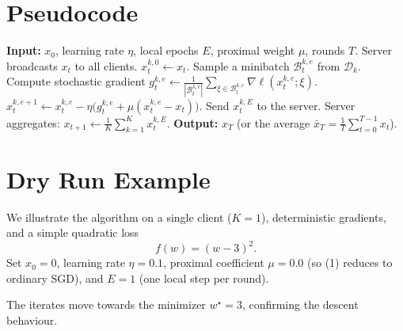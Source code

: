 \documentclass[11pt]{article}
\begin{document}
\section*{Pseudocode}
\begin{algorithm}[H]
\caption{FedProx with Local SGD}
\begin{algorithmic}[1]
\STATE \textbf{Input:} $x_0$, learning rate $\eta$, local epochs $E$, proximal weight $\mu$, rounds $T$.
    \STATE Server broadcasts $x_t$ to all clients.
        \STATE $x_{t}^{k,0}\gets x_t$.
            \STATE Sample a minibatch $\mathcal{B}_{t}^{k,e}$ from $\mathcal{D}_k$.
            \STATE Compute stochastic gradient 
            $g_{t}^{k,e}\gets \frac{1}{|\mathcal{B}_{t}^{k,e}|}\sum_{\xi\in\mathcal{B}_{t}^{k,e}}\nabla\ell(x_{t}^{k,e};\xi)$.
            \STATE $x_{t}^{k,e+1}\gets x_{t}^{k,e}-\eta\big(g_{t}^{k,e}+\mu (x_{t}^{k,e}-x_t)\big)$.
        \ENDFOR
        \STATE Send $x_{t}^{k,E}$ to the server.
    \ENDFOR
    \STATE Server aggregates: $x_{t+1}\gets \frac1K\sum_{k=1}^K x_{t}^{k,E}$.
\ENDFOR
\STATE \textbf{Output:} $x_T$ (or the average $\bar x_T=\frac1T\sum_{t=0}^{T-1}x_t$).
\end{algorithmic}
\end{algorithm}

\section*{Dry Run Example}
We illustrate the algorithm on a single client ($K=1$), deterministic gradients, and a simple quadratic loss 
\[
f(w)=(w-3)^2.
\]
Set $x_0=0$, learning rate $\eta=0.1$, proximal coefficient $\mu=0.0$ (so (1) reduces to ordinary SGD), and $E=1$ (one local step per round).  

The iterates move towards the minimizer $w^$, confirming the descent behaviour.
\end{document}
